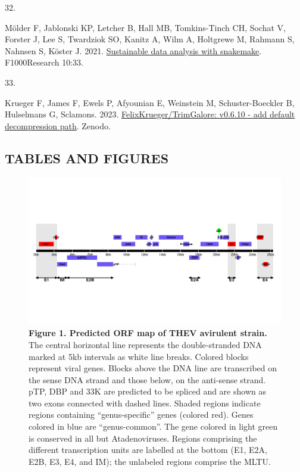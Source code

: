 \documentclass[
]{article}
\newlength{\cslhangindent}
\newlength{\csllabelwidth}
\newenvironment{CSLReferences}[2] %
 {\begin{list}{}{%
  \setlength{\itemindent}{0pt}
  \setlength{\leftmargin}{0pt}
  \setlength{\parsep}{0pt}
  \ifodd #1
   \setlength{\leftmargin}{\cslhangindent}
   \setlength{\itemindent}{-1\cslhangindent}
  \fi
  \setlength{\itemsep}{#2\baselineskip}}}
 {\end{list}}
\newcommand{\CSLLeftMargin}[1]{\parbox[t]{\csllabelwidth}{\strut#1\strut}}
\newcommand{\CSLRightInline}[1]{\parbox[t]{\linewidth - \csllabelwidth}{\strut#1\strut}}
\begin{document}
\begin{CSLReferences}{0}{1}
\CSLLeftMargin{32. }%
\CSLRightInline{Mölder F, Jablonski KP, Letcher B, Hall MB,
Tomkins-Tinch CH, Sochat V, Forster J, Lee S, Twardziok SO, Kanitz A,
Wilm A, Holtgrewe M, Rahmann S, Nahnsen S, Köster J. 2021.
\href{https://doi.org/10.12688/f1000research.29032.2}{Sustainable data
analysis with snakemake}. F1000Research 10:33.}

\CSLLeftMargin{33. }%
\CSLRightInline{Krueger F, James F, Ewels P, Afyounian E, Weinstein M,
Schuster-Boeckler B, Hulselmans G, Sclamons. 2023.
\href{https://doi.org/10.5281/ZENODO.7598955}{FelixKrueger/TrimGalore:
v0.6.10 - add default decompression path}. Zenodo.}

\end{CSLReferences}

\setlength{\parindent}{0in}
\setlength{\leftskip}{0in}
\newpage

\newpage

\subsection{TABLES AND FIGURES}\label{tables-and-figures}

\begin{figure}
\centering
\includegraphics{results/r/figures/thev_orf_map.png}
\caption{\textbf{Figure 1. Predicted ORF map of THEV avirulent strain.}
The central horizontal line represents the double-stranded DNA marked at
5kb intervals as white line breaks. Colored blocks represent viral
genes. Blocks above the DNA line are transcribed on the sense DNA strand
and those below, on the anti-sense strand. pTP, DBP and 33K are
predicted to be spliced and are shown as two exons connected with dashed
lines. Shaded regions indicate regions containing ``genus-specific''
genes (colored red). Genes colored in blue are ``genus-common''. The
gene colored in light green is conserved in all but Atadenoviruses.
Regions comprising the different transcription units are labelled at the
bottom (E1, E2A, E2B, E3, E4, and IM); the unlabeled regions comprise
the MLTU.}
\end{figure}
\end{document}
